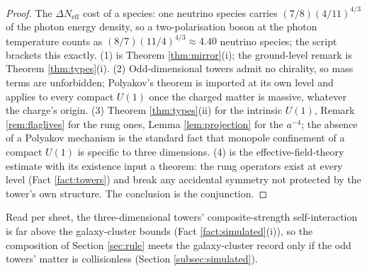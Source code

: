 \documentclass[11pt]{article}
\theoremstyle{definition}
\newcommand{\Neff}{N_{\mathrm{eff}}}
\begin{document}
\begin{proof}
The $\Delta\Neff$ cost of a species: one neutrino species carries $(7/8)(4/11)^{4/3}$ of the photon energy density, so a two-polarisation boson at the photon temperature counts as $(8/7)(11/4)^{4/3} \approx 4.40$ neutrino species; the script brackets this exactly. (1) is Theorem \ref{thm:mirror}(i); the ground-level remark is Theorem \ref{thm:types}(i). (2) Odd-dimensional towers admit no chirality, so mass terms are unforbidden; Polyakov's theorem is imported at its own level and applies to every compact $U(1)$ once the charged matter is massive, whatever the charge's origin. (3) Theorem \ref{thm:types}(ii) for the intrinsic $U(1)$, Remark \ref{rem:flaglives} for the rung ones, Lemma \ref{lem:projection} for the $a^{-4}$; the absence of a Polyakov mechanism is the standard fact that monopole confinement of a compact $U(1)$ is specific to three dimensions. (4) is the effective-field-theory estimate with its existence input a theorem: the rung operators exist at every level (Fact \ref{fact:towers}) and break any accidental symmetry not protected by the tower's own structure. The conclusion is the conjunction.
\end{proof}

Read per sheet, the three-dimensional towers' composite-strength self-interaction is far above the galaxy-cluster bounds (Fact \ref{fact:simulated}(i)), so the composition of Section \ref{sec:rule} meets the galaxy-cluster record only if the odd towers' matter is collisionless (Section \ref{subsec:simulated}).
\end{document}
